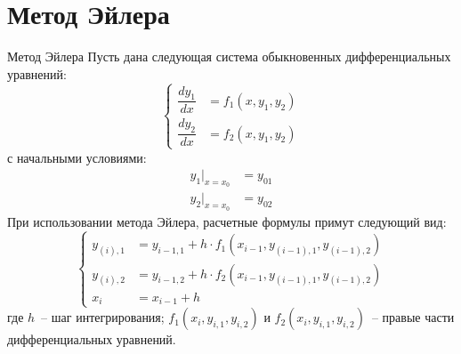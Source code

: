 \documentclass[aspectratio=169, mathserif]{beamer}	%
\begin{document}
\section{Метод Эйлера}
\sectionframe

\begin{frame}[fragile, label=c]{Метод Эйлера}
\scriptsize
Пусть дана следующая система обыкновенных дифференциальных уравнений:
\vfill
\begin{equation}
	\left\{
	\begin{aligned}
		\dfrac{dy_1}{dx} &= f_1 \left(x, y_1, y_2\right) \\
		\dfrac{dy_2}{dx} &= f_2\left(x, y_1, y_2\right)
	\end{aligned}
	\right.
\end{equation}
\vfill
\noindent с начальными условиями:
\vfill
\begin{equation}
	\begin{aligned}
		y_1 \big |_{x=x_0} &= y_{01} \\
		y_2 \big |_{x=x_0} &= y_{02}
	\end{aligned}
\end{equation}
\vfill
При использовании метода Эйлера, расчетные формулы примут следующий вид:
\vfill
\begin{equation}\label{Eiler_system}
	\left\{
	\begin{aligned}
		y_{(i), 1} &= y_{i-1,1} + h \cdot f_1 \left(x_{i-1}, y_{(i-1),1}, y_{(i-1),2}\right) \\
		y_{(i), 2} &= y_{i-1,2} + h \cdot f_2 \left(x_{i-1}, y_{(i-1),1}, y_{(i-1),2}\right) \\
		x_{i} &= x_{i-1} + h
	\end{aligned}
	\right.
\end{equation}
\vfill
\noindent где $h$~-- шаг интегрирования; $f_1\left(x_i, y_{i, 1}, y_{i, 2}\right)$ и $f_2\left(x_i, y_{i, 1}, y_{i, 2}\right)$~-- правые части дифференциальных уравнений.
\vfill
\end{frame}
\end{document}
